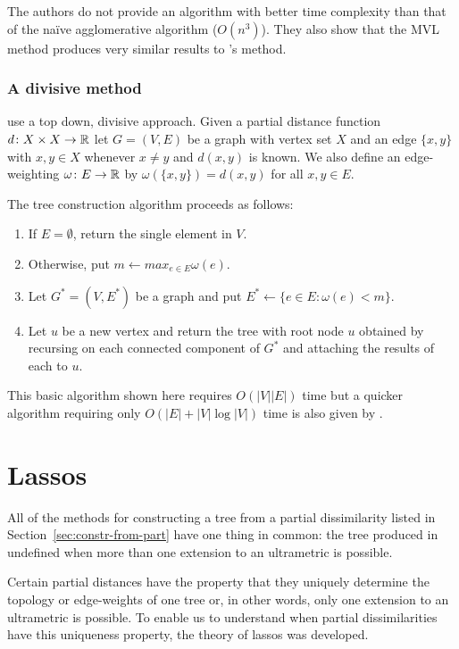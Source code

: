The authors do not provide an algorithm with better time complexity than that
of the naïve agglomerative algorithm ($O(n^3)$).  They also show that the MVL
method produces very similar results to \citeauthor{de1984ultrametric}'s
method.

\subsubsection{A divisive method}
\label{sec:part-dist-divisive-method}

\citet{farach1995robust} use a top down, divisive approach.  Given a partial
distance function $d \colon X \times X \to {\mathbb R}$ let $G=(V,E)$ be a graph with
vertex set $X$ and an edge $\{x,y\}$ with $x,y \in X$ whenever $x \neq y$ and
$d(x,y)$ is known.  We also define an edge-weighting $\omega \colon E \to {\mathbb R}$
by $\omega(\{x,y\}) = d(x,y)$ for all $x,y \in E$.

The tree construction algorithm proceeds as follows:
\begin{enumerate}
\item If $E = \emptyset$, return the single element in $V$.
\item Otherwise, put $m \gets max_{e \in E} \omega(e)$.
\item Let $G^* = (V,E^*)$ be a graph and put $E^* \gets \{e \in E \colon
  \omega(e) < m\}$.
\item Let $u$ be a new vertex and return the tree with root node $u$ obtained
  by recursing on each connected component of $G^*$ and attaching the results
  of each to $u$.
\end{enumerate}
This basic algorithm shown here requires $O(|V||E|)$ time but a quicker
algorithm requiring only $O(|E| + |V|\log |V|)$ time is also given by
\citet{farach1995robust}.

\section{Lassos}
\label{sec:lassoing-corralling}

All of the methods for constructing a tree from a partial dissimilarity listed
in Section~\ref{sec:constr-from-part} have one thing in common: the tree
produced in undefined when more than one extension to an ultrametric is
possible.

Certain partial distances have the property that they uniquely determine the
topology or edge-weights of one tree or, in other words, only one extension to
an ultrametric is possible.  To enable us to understand when partial
dissimilarities have this uniqueness property, the theory of lassos was
developed.

